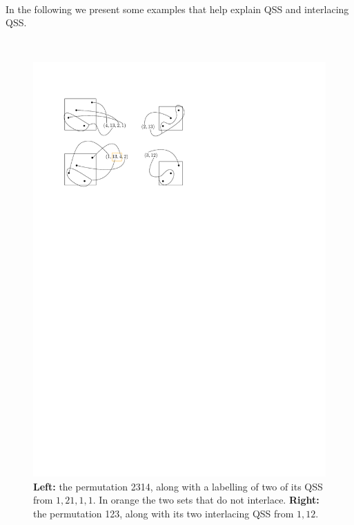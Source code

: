 \documentclass[12pt, reqno]{amsart}
\theoremstyle{definition}
\begin{document}
\

In the following we present some examples that help explain QSS and interlacing QSS.

\


\begin{figure}[h]
    \centering
    \includegraphics{../images/interlacing_25314_square.pdf}
    \caption{\textbf{Left:} the permutation 2314, along with a labelling of two of its QSS from $1, 21, 1, 1$. In orange the two sets that do not interlace. \textbf{Right:} the permutation 123, along with its two interlacing QSS from $1, 12$.\label{fig:interlacingQSSsmpl}}
\end{figure}
\end{document}

